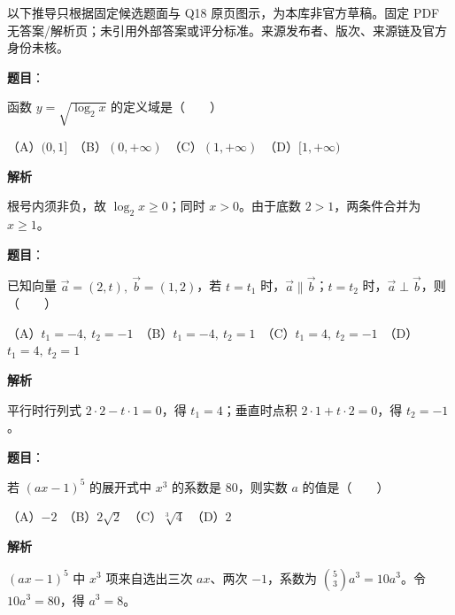 

\begin{gktip}
以下推导只根据固定候选题面与 Q18 原页图示，为本库非官方草稿。固定 PDF 无答案/解析页；未引用外部答案或评分标准。来源发布者、版次、来源链及官方身份未核。
\end{gktip}

\begin{answer}

\textbf{题目}：

函数 $y=\sqrt{\log_2 x}$ 的定义域是\mbox{（　　）}

（A）$(0,1]$　（B）$(0,+\infty)$　（C）$(1,+\infty)$　（D）$[1,+\infty)$

\textbf{解析}

根号内须非负，故 $\log_2x\geqslant0$；同时 $x>0$。由于底数 $2>1$，两条件合并为 $x\geqslant1$。

\gkanswer{答案：D，$[1,+\infty)$。}

\end{answer}
\begin{answer}

\textbf{题目}：

已知向量 $\vec a=(2,t),\ \vec b=(1,2)$，若 $t=t_1$ 时，$\vec a\parallel\vec b$；$t=t_2$ 时，$\vec a\perp\vec b$，则\mbox{（　　）}

（A）$t_1=-4,\ t_2=-1$　（B）$t_1=-4,\ t_2=1$　（C）$t_1=4,\ t_2=-1$　（D）$t_1=4,\ t_2=1$

\textbf{解析}

平行时行列式 $2\cdot2-t\cdot1=0$，得 $t_1=4$；垂直时点积 $2\cdot1+t\cdot2=0$，得 $t_2=-1$。


\end{answer}
\begin{answer}

\textbf{题目}：

若 $(ax-1)^5$ 的展开式中 $x^3$ 的系数是 80，则实数 $a$ 的值是\mbox{（　　）}

（A）$-2$　（B）$2\sqrt2$　（C）$\sqrt[3]{4}$　（D）$2$

\textbf{解析}

$(ax-1)^5$ 中 $x^3$ 项来自选出三次 $ax$、两次 $-1$，系数为 $\binom53a^3=10a^3$。令 $10a^3=80$，得 $a^3=8$。


\end{answer}

